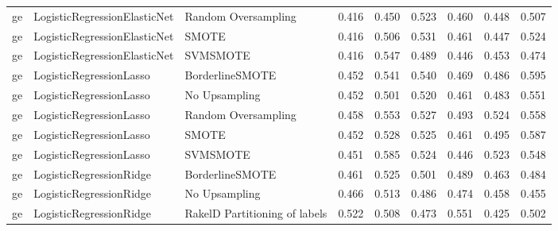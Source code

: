 \begin{tabular}{lllllllll}
      ge &    LogisticRegressionElasticNet &           Random Oversampling & 0.416 &                     0.450 &                 0.523 &                  0.460 &                                   0.448 &     0.507 \\
      ge &    LogisticRegressionElasticNet &                         SMOTE & 0.416 &                     0.506 &                 0.531 &                  0.461 &                                   0.447 &     0.524 \\
      ge &    LogisticRegressionElasticNet &                      SVMSMOTE & 0.416 &                     0.547 &                 0.489 &                  0.446 &                                   0.453 &     0.474 \\
      ge &         LogisticRegressionLasso &               BorderlineSMOTE & 0.452 &                     0.541 &                 0.540 &                  0.469 &                                   0.486 &     0.595 \\
      ge &         LogisticRegressionLasso &                 No Upsampling & 0.452 &                     0.501 &                 0.520 &                  0.461 &                                   0.483 &     0.551 \\
      ge &         LogisticRegressionLasso &           Random Oversampling & 0.458 &                     0.553 &                 0.527 &                  0.493 &                                   0.524 &     0.558 \\
      ge &         LogisticRegressionLasso &                         SMOTE & 0.452 &                     0.528 &                 0.525 &                  0.461 &                                   0.495 &     0.587 \\
      ge &         LogisticRegressionLasso &                      SVMSMOTE & 0.451 &                     0.585 &                 0.524 &                  0.446 &                                   0.523 &     0.548 \\
      ge &         LogisticRegressionRidge &               BorderlineSMOTE & 0.461 &                     0.525 &                 0.501 &                  0.489 &                                   0.463 &     0.484 \\
      ge &         LogisticRegressionRidge &                 No Upsampling & 0.466 &                     0.513 &                 0.486 &                  0.474 &                                   0.458 &     0.455 \\
      ge &         LogisticRegressionRidge & RakelD Partitioning of labels & 0.522 &                     0.508 &                 0.473 &                  0.551 &                                   0.425 &     0.502 \\

\end{tabular}
